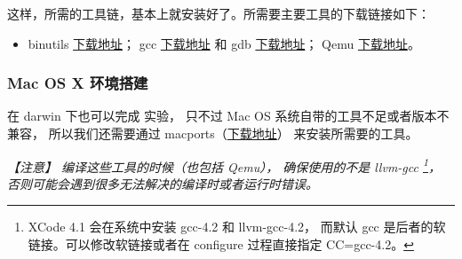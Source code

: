 \begin{small}
这样，所需的工具链，基本上就安装好了。所需要主要工具的下载链接如下：
\begin{itemize}
    \item %
        binutils \href{http://ftp.gnu.org/gnu/binutils/}{下载地址}；
        gcc \href{http://gcc.gnu.org/mirrors.html}{下载地址} 和 gdb \href{http://ftp.gnu.org/gnu/gdb/}{下载地址}；
        Qemu \href{http://wiki.qemu.org/Download}{下载地址}。 
\end{itemize}
\end{small}

\subsubsection{Mac OS X 环境搭建}

在 darwin 下也可以完成 \ucore 实验，
只不过 Mac OS 系统自带的工具不足或者版本不兼容，
所以我们还需要通过 macports（\href{http://http://www.macports.org/}{下载地址}）
来安装所需要的工具。

{\emph{
【注意】
编译这些工具的时候（也包括 Qemu），
确保使用的不是 llvm-gcc
\footnote{XCode 4.1 会在系统中安装 gcc-4.2 和 llvm-gcc-4.2，
而默认 gcc 是后者的软链接。可以修改软链接或者在 configure 过程直接指定 CC=gcc-4.2。}，
否则可能会遇到很多无法解决的编译时或者运行时错误。}}

